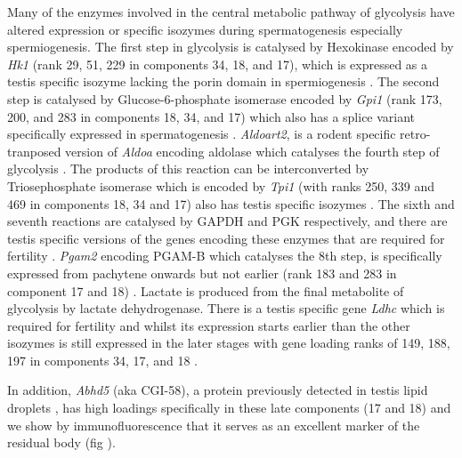 Many of the enzymes involved in the central metabolic pathway of glycolysis have altered expression or specific isozymes during spermatogenesis especially spermiogenesis. The first step in glycolysis is catalysed by Hexokinase encoded by \textit{Hk1} (rank 29, 51, 229 in components 34, 18, and 17), which is expressed as a testis specific isozyme lacking the porin domain in spermiogenesis \parencite{Mori1993Unique,Nakamura2008Spermatogenic}. The second step is catalysed by Glucose-6-phosphate isomerase encoded by \textit{Gpi1} (rank 173, 200, and 283 in components 18, 34, and 17) which also has a splice variant specifically expressed in spermatogenesis \parencite{Buehr1981electrophoretically, Vemuganti2010Frequent}. \textit{Aldoart2}, is a rodent specific retro-tranposed version of \textit{Aldoa} encoding aldolase which catalyses the fourth step of glycolysis \parencite{Vemuganti2007Three, Vemuganti2010Frequent}. The products of this reaction can be interconverted by Triosephosphate isomerase which is encoded by \textit{Tpi1} (with ranks 250, 339 and 469 in components 18, 34 and 17) also has testis specific isozymes \parencite{Ijiri2013Male}. The sixth and seventh reactions are catalysed by GAPDH and PGK respectively, and there are testis specific versions of the genes encoding these enzymes that are required for fertility \parencite{McCarrey1987Human,Welch1992Expression, Miki2004Glyceraldehyde, Danshina2010Phosphoglycerate}.  \textit{Pgam2} encoding PGAM-B which catalyses the 8th step, is specifically expressed from pachytene onwards but not earlier (rank 183 and 283 in component 17 and 18) \parencite{Fundele1987Developmental}.  Lactate is produced from the final metabolite of glycolysis by lactate dehydrogenase. There is a testis specific gene \textit{Ldhc} which is required for fertility and whilst its expression starts earlier than the other isozymes is still expressed in the later stages with gene loading ranks of 149, 188, 197 in components 34, 17, and 18 \parencite{Sakai1987Molecular, Odet2008Expression}.


In addition, \textit{Abhd5} (aka CGI-58), a protein previously detected in testis lipid droplets \parencite{Wang2015Proteomic}, has high loadings specifically in these late components (17 and 18) and we show by immunofluorescence that it serves as an excellent marker of the residual body (fig \label{fig:IF}).



